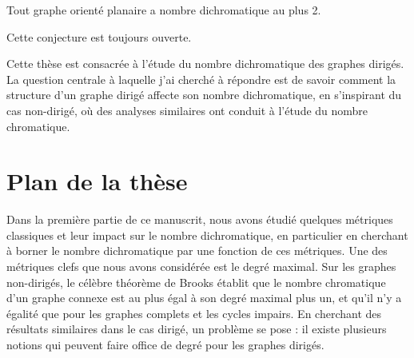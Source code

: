 \begin{conjecturefr}
Tout graphe orienté planaire a nombre dichromatique au plus 2.
\end{conjecturefr}

Cette conjecture est toujours ouverte.








\medskip

Cette thèse est consacrée à l'étude du nombre dichromatique des graphes dirigés. La question centrale à laquelle j'ai cherché à répondre est de savoir comment la structure d'un graphe dirigé affecte son nombre dichromatique, en s'inspirant du cas non-dirigé, où des analyses similaires ont conduit à l'étude du nombre chromatique.

\section*{Plan de la thèse}

Dans la première partie de ce manuscrit, nous avons étudié quelques métriques classiques et leur impact sur le nombre dichromatique, en particulier en cherchant à borner le nombre dichromatique par une fonction de ces métriques. Une des métriques clefs que nous avons considérée est le degré maximal. Sur les graphes non-dirigés, le célèbre théorème de Brooks \cite{B41} établit que le nombre chromatique d'un graphe connexe est au plus égal à son degré maximal plus un, et qu'il n'y a égalité que pour les graphes complets et les cycles impairs. En cherchant des résultats similaires dans le cas dirigé, un problème se pose : il existe plusieurs notions qui peuvent faire office de degré pour les graphes dirigés.

